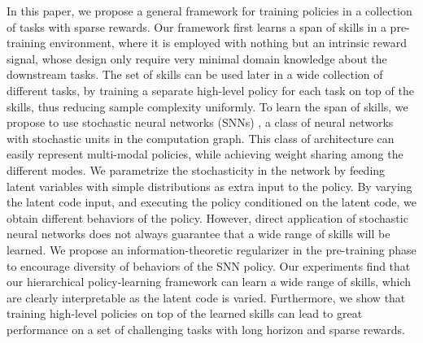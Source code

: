 \documentclass{article} %
\begin{document}
In this paper, we propose a general framework for training policies in a collection of tasks with sparse rewards.
Our framework first learns a span of skills in a pre-training environment, where it is employed with nothing but an intrinsic reward signal, whose design only require very minimal domain knowledge about the downstream tasks.
The set of skills can be used later in a wide collection of different tasks, by training a separate high-level policy for each task on top of the skills, thus reducing sample complexity uniformly.
To learn the span of skills, we propose to use stochastic neural networks (SNNs) \citep{neal1990learning, neal1992connectionist, tang2013learning}, a class of neural networks with stochastic units in the computation graph.
This class of architecture can easily represent multi-modal policies, while achieving weight sharing among the different modes.
We parametrize the stochasticity in the network by feeding latent variables with simple distributions as extra input to the policy.
By varying the latent code input, and executing the policy conditioned on the latent code, we obtain different behaviors of the policy.
However, direct application of stochastic neural networks does not always guarantee that a wide range of skills will be learned. 
We propose an information-theoretic regularizer in the pre-training phase to encourage diversity of behaviors of the SNN policy.
Our experiments find that our hierarchical policy-learning framework can learn a wide range of skills, which are clearly interpretable as the latent code is varied. Furthermore, we show that training high-level policies on top of the learned skills can lead to great performance on a set of challenging tasks with long horizon and sparse rewards. %




\end{document}
